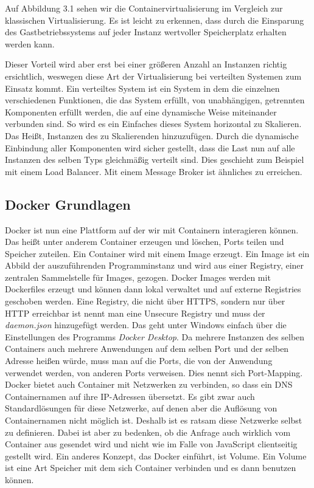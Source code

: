 \documentclass[12pt,a4paper]{scrartcl}
\begin{document}
Auf Abbildung 3.1 sehen wir die Containervirtualisierung im Vergleich zur klassischen Virtualisierung. Es ist leicht zu erkennen, dass durch die Einsparung des Gastbetriebssystems auf jeder Instanz wertvoller Speicherplatz erhalten werden kann. 

Dieser Vorteil wird aber erst bei einer größeren Anzahl an Instanzen richtig ersichtlich, weswegen diese Art der Virtualisierung bei verteilten Systemen zum Einsatz kommt. Ein verteiltes System ist ein System in dem die einzelnen verschiedenen Funktionen, die das System erfüllt, von unabhängigen, getrennten Komponenten erfüllt werden, die auf eine dynamische Weise miteinander verbunden sind. So wird es ein Einfaches dieses System horizontal zu Skalieren. Das Heißt, Instanzen des zu Skalierenden hinzuzufügen. Durch die dynamische Einbindung aller Komponenten wird sicher gestellt, dass die Last nun auf alle Instanzen des selben Typs gleichmäßig verteilt sind. Dies geschieht zum Beispiel mit einem Load Balancer. Mit einem Message Broker ist ähnliches zu erreichen.

\subsection{Docker Grundlagen}

Docker ist nun eine Plattform auf der wir mit Containern interagieren können. Das heißt unter anderem Container erzeugen und löschen, Ports teilen und Speicher zuteilen. Ein Container wird mit einem Image erzeugt. Ein Image ist ein Abbild der auszuführenden Programminstanz und wird aus einer Registry, einer zentralen Sammelstelle für Images, gezogen. Docker Images werden mit Dockerfiles erzeugt und können dann lokal verwaltet und auf externe Registries geschoben werden. Eine Registry, die nicht über HTTPS, sondern nur über HTTP erreichbar ist nennt man eine Unsecure Registry und muss der \emph{daemon.json} hinzugefügt werden. Das geht unter Windows einfach über die Einstellungen des Programms \emph{Docker Desktop}. Da mehrere Instanzen des selben Containers auch mehrere Anwendungen auf dem selben Port und der selben Adresse heißen würde, muss man auf die Ports, die von der Anwendung verwendet werden, von anderen Ports verweisen. Dies nennt sich Port-Mapping. 
Docker bietet auch Container mit Netzwerken zu verbinden, so dass ein DNS Containernamen auf ihre IP-Adressen übersetzt. Es gibt zwar auch Standardlösungen für diese Netzwerke, auf denen aber die Auflösung von Containernamen nicht möglich ist. Deshalb ist es ratsam diese Netzwerke selbst zu definieren.
Dabei ist aber zu bedenken, ob die Anfrage auch wirklich vom Container aus gesendet wird und nicht wie im Falle von JavaScript clientseitig gestellt wird.
Ein anderes Konzept, das Docker einführt, ist Volume. Ein Volume ist eine Art Speicher mit dem sich Container verbinden und es dann benutzen können.
\end{document}
